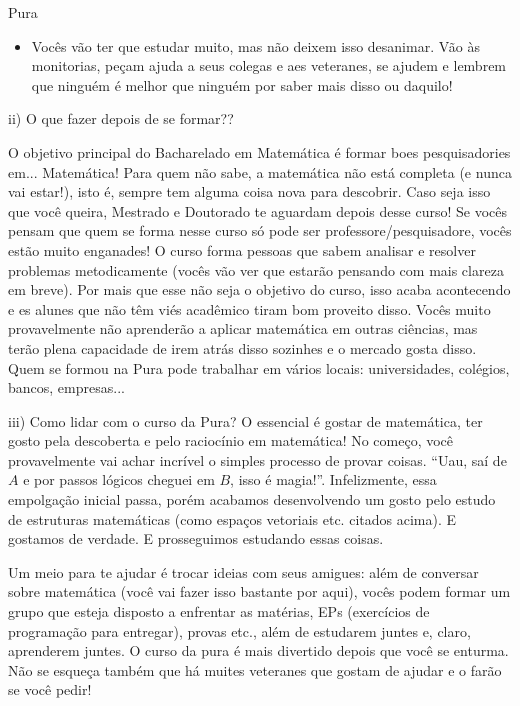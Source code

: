\begin{subsecao}{Pura}
\begin{itemize}
ótimo momento para aprender a fazer demonstrações. Em 2017, juntaram as duas geometrias diferenciais em apenas uma
matéria e cálculo VI passou a ser obrigatória. Agora o curso tem os cálculos 1, 2, 3,
5 e 6 (Para onde foi cálculo 4? A demonstração fica a cargo do leitor).
O curso está sempre se atualizando para oferecer o melhor para es estudantes,
então se mobilizem para continuar melhorando a Pura (conversem com es RDs sobre isso!).
\item  Vocês vão ter que estudar muito, mas não deixem isso desanimar. Vão às monitorias,
peçam ajuda a seus colegas e aes veteranes, se ajudem e lembrem que ninguém é melhor 
que ninguém por saber mais disso ou daquilo!

\end{itemize}
ii) O que fazer depois de se formar??

O objetivo principal do Bacharelado em Matemática é formar boes pesquisadories
em... Matemática! Para quem não sabe, a matemática não está completa (e nunca
vai estar!), isto é, sempre tem alguma coisa nova para descobrir. Caso seja isso
que você queira, Mestrado e Doutorado te aguardam depois desse curso! Se vocês
pensam que quem se forma nesse curso só pode ser professore/pesquisadore, vocês
estão muito enganades! O curso forma pessoas que sabem analisar e resolver problemas
metodicamente (vocês vão ver que estarão pensando com mais clareza em breve). Por
mais que esse não seja o objetivo do curso, isso acaba acontecendo e es alunes
que não têm viés acadêmico tiram bom proveito disso. Vocês muito provavelmente
não aprenderão a aplicar matemática em outras ciências, mas terão plena capacidade
de irem atrás disso sozinhes e o mercado gosta disso. Quem se formou na Pura pode
trabalhar em vários locais: universidades, colégios, bancos, empresas...

iii) Como lidar com o curso da Pura?
O essencial é gostar de matemática, ter gosto pela descoberta e pelo raciocínio
em matemática! No começo, você provavelmente vai achar incrível o simples processo
de provar coisas. ``Uau, saí de $A$ e por passos lógicos cheguei em $B$, isso é
magia!''. Infelizmente, essa empolgação inicial passa, porém acabamos desenvolvendo
um gosto pelo estudo de estruturas matemáticas (como espaços vetoriais etc.
citados acima). E gostamos de verdade. E prosseguimos estudando essas coisas.

Um meio para te ajudar é trocar ideias com seus amigues: além de conversar
sobre matemática (você vai fazer isso bastante por aqui), vocês podem formar um
grupo que esteja disposto a enfrentar as matérias, EPs (exercícios de
programação para entregar), provas etc., além de estudarem juntes e, claro,
aprenderem juntes. O curso da pura é mais divertido depois que você se enturma. Não se
esqueça também que há muites veteranes que gostam de ajudar e o farão se você pedir!


\end{subsecao}
